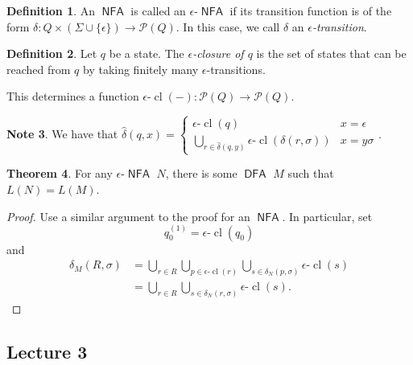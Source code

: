 \documentclass[10pt,letterpaper,cm]{nupset}
\theoremstyle{definition}
\newtheorem{definition}{Definition}[subsection]
\newtheorem{note}[definition]{Note}
\theoremstyle{theorem}
\newtheorem{theorem}[definition]{Theorem}
\theoremstyle{remark}
\renewcommand{\P}{\mathcal P}
\newcommand{\1}{\mathbf{1}}
\newcommand{\0}{\vec 0}
\DeclareMathOperator{\cl}{cl}
\DeclareMathOperator{\DFA}{\mathsf{DFA}}
\DeclareMathOperator{\NFA}{\mathsf{NFA}}
\begin{document}
\begin{definition}
An $\NFA$ is called an $\epsilon$-$\NFA$ if its transition function is of the form $\delta: Q\times (\Sigma \cup \{\epsilon\}) \to \P(Q)$. In this case, we call $\delta$ an \textit{$\epsilon$-transition}.
\end{definition}

\begin{definition}
Let $q$ be a state. The \textit{$\epsilon$-closure of $q$} is the set of states that can be reached from $q$ by taking finitely many $\epsilon$-transitions. 
\end{definition}

This determines a function $\epsilon$-$\cl(-): \P(Q) \to \P(Q)$.

\smallskip

\begin{note}
We have that $\hat{\delta}(q, x) = \begin{cases} \epsilon \text{-}\cl(q) & x = \epsilon
\\ \bigcup_{r\in \hat{\delta}(q, y)} \epsilon \text{-}\cl(\delta(r, \sigma)) & x = y\sigma 
\end{cases}.$
\end{note}

\begin{theorem}
For any $\epsilon$-$\NFA$ $N$, there is some $\DFA$ $M$ such that $L(N) = L(M)$.
\end{theorem}
\begin{proof}
Use a similar argument to the proof for an $\NFA$. In particular, set $$q_0^{(1)} = \epsilon \text{-}\cl(q_0)$$ and 
\begin{align*}
\delta_M(R, \sigma)  & =  \bigcup_{r\in R}\bigcup_{p\in \epsilon \text{-}\cl(r)} \bigcup_{s\in \delta_N(p, \sigma)} \epsilon \text{-}\cl(s)
\\ & = \bigcup_{r\in R} \bigcup_{s\in \delta_N(r, \sigma)} \epsilon \text{-}\cl(s)
.\end{align*}
\end{proof}

\subsection{Lecture 3}
\end{document}
